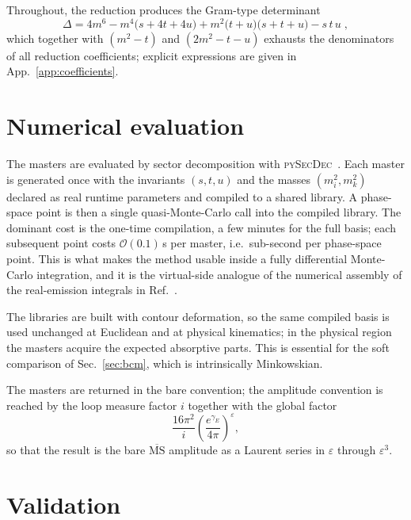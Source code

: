 \documentclass[11pt,a4paper]{article}
\newcommand{\eps}{\varepsilon}
\newcommand{\msbar}{\overline{\text{MS}}}
\newcommand{\Gram}{\Delta}
\begin{document}
Throughout, the reduction produces the Gram-type determinant
\begin{equation}
  \Gram = 4m^6-m^4\big(s+4t+4u\big)+m^2\big(t+u\big)\big(s+t+u\big)-s\,t\,u\;,
  \label{eq:gram}
\end{equation}
which together with $(m^2-t)$ and $(2m^2-t-u)$ exhausts the denominators of all
reduction coefficients; explicit expressions are given in
App.~\ref{app:coefficients}.

\section{Numerical evaluation}
\label{sec:numerics}
The masters are evaluated by sector decomposition with
\textsc{pySecDec}~\cite{pySecDec}. Each master is generated once with the
invariants $(s,t,u)$ and the masses $(m_i^2,m_k^2)$ declared as  {real
runtime parameters} and compiled to a shared library. A phase-space point is then
a single quasi-Monte-Carlo call into the compiled library. The dominant cost is
the one-time compilation, a few minutes for the full basis; each subsequent point
costs $\mathcal{O}(0.1)\,$s per master, i.e.\ sub-second per phase-space point.
This is what makes the method usable inside a fully differential Monte-Carlo
integration, and it is the virtual-side analogue of the numerical assembly of the
real-emission integrals in Ref.~\cite{Czakon:stripper}.

The libraries are built with contour deformation, so the same compiled basis is
used unchanged at Euclidean and at physical kinematics; in the physical region the
masters acquire the expected absorptive parts. This is essential for the soft
comparison of Sec.~\ref{sec:bcm}, which is intrinsically Minkowskian.

The masters are returned in the bare convention; the amplitude convention is
reached by the loop measure factor $i$ together with the global factor
\begin{equation}
  \frac{16\pi^2}{i}\left(\frac{e^{\gamma_E}}{4\pi}\right)^{\!\eps},
  \label{eq:msbarfac}
\end{equation}
so that the result is the bare $\msbar$ amplitude as a Laurent series in $\eps$
through $\eps^{3}$.

\section{Validation}
\label{sec:validation}
\end{document}
